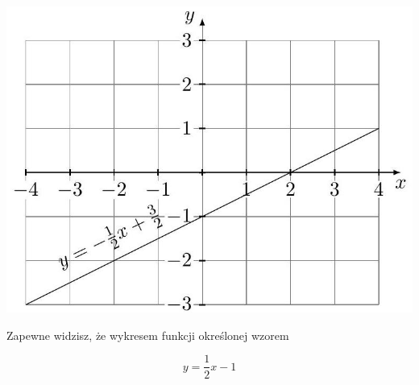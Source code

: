 \documentclass[10pt]{article}
\begin{document}
\begin{center}
\includegraphics[max width=\textwidth]{2024_11_21_e9b4faa005d5be2cc318g-130}
\end{center}

Zapewne widzisz, że wykresem funkcji określonej wzorem

\[
y=\frac{1}{2} x-1
\]
\end{document}
